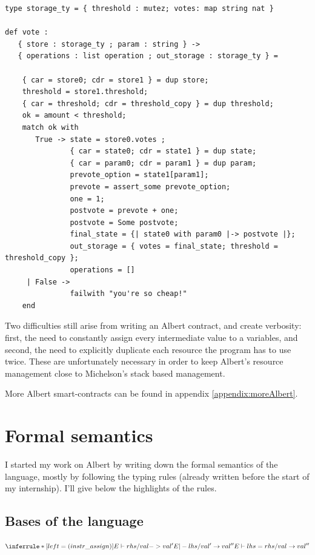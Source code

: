 \documentclass{report}
\begin{document}
\lstset{language=albert}
\begin{lstlisting}
type storage_ty = { threshold : mutez; votes: map string nat }

def vote :
   { store : storage_ty ; param : string } ->
   { operations : list operation ; out_storage : storage_ty } =

    { car = store0; cdr = store1 } = dup store;
    threshold = store1.threshold;
    { car = threshold; cdr = threshold_copy } = dup threshold;
    ok = amount < threshold;
    match ok with
       True -> state = store0.votes ;
               { car = state0; cdr = state1 } = dup state;
               { car = param0; cdr = param1 } = dup param;
               prevote_option = state1[param1];
               prevote = assert_some prevote_option;
               one = 1;
               postvote = prevote + one;
               postvote = Some postvote;
               final_state = {| state0 with param0 |-> postvote |};
               out_storage = { votes = final_state; threshold = threshold_copy };
               operations = []
     | False ->
               failwith "you're so cheap!"
    end
\end{lstlisting}

Two difficulties still arise from writing an Albert contract, and create verbosity: first, the need to constantly assign every intermediate value to a variables, and second, the need to explicitly duplicate each resource the program has to use twice. These are unfortunately necessary in order to keep Albert's resource management close to Michelson's stack based management.

More Albert smart-contracts can be found in appendix \ref{appendix:moreAlbert}.

\section{Formal semantics}
\label{albertSemantics}

I started my work on Albert by writing down the formal semantics of the language, mostly by following the typing rules (already written before the start of my internship). I'll give below the highlights of the rules.

\subsection{Bases of the language}

$$
\inferrule* [left=(instr\_assign)]
    { E \vdash rhs / val -> val' \\ E |- lhs / val' \rightarrow val'' }
    { E \vdash lhs = rhs / val \rightarrow val'' }
$$
\end{document}
